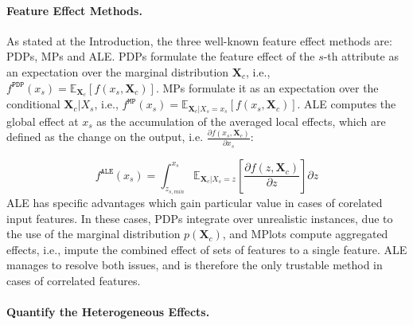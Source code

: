 \documentclass[twoside]{article}
\newcommand{\Xcb}{\mathbf{X}_c}
\begin{document}
\paragraph{Feature Effect Methods.} As stated at the Introduction, the
three well-known feature effect methods are: PDPs, MPs and ALE. PDPs
formulate the feature effect of the \(s\)-th attribute as an
expectation over the marginal distribution \(\mathbf{X}_c\), i.e.,
\(f^{\mathtt{PDP}}(x_s) =
\mathbb{E}_{\mathbf{X}_c}[f(x_s,\mathbf{X}_c)]\). MPs formulate it as
an expectation over the conditional \(\mathbf{X}_c|X_s\), i.e.,
\(f^{\mathtt{MP}}(x_s) = \mathbb{E}_{\mathbf{X}_c|X_s = x_s}[f(x_s,
\mathbf{X}_c)]\). ALE computes the global effect at \(x_s\) as the
accumulation of the averaged local effects, which are defined as the
change on the output, i.e.
\( \frac{\partial f(x_s, \mathbf{X}_c)}{\partial x_s} \):

\begin{equation}
  \label{eq:ALE_accumulated_mean}
  f^{\mathtt{ALE}}(x_s) = \int_{z_{s,min}}^{x_s} \mathbb{E}_{\Xcb|X_s=z}\left[\frac{\partial f(z, \Xcb)}{\partial z}\right] \partial z
\end{equation}
%
ALE has specific advantages which gain particular value in cases of
corelated input features. In these cases, PDPs integrate over
unrealistic instances, due to the use of the marginal distribution
\( p(\mathbf{X}_c) \), and MPlots compute aggregated effects, i.e.,
impute the combined effect of sets of features to a single
feature. ALE manages to resolve both issues, and is therefore the only
trustable method in cases of correlated features.

\paragraph{Quantify the Heterogeneous Effects.}
\end{document}
